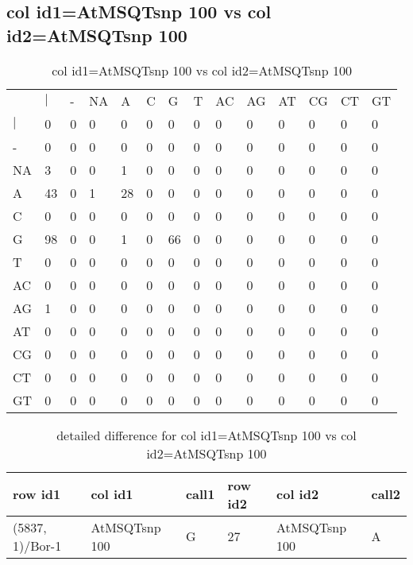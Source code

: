 \subsection{col id1=AtMSQTsnp 100 vs col id2=AtMSQTsnp 100}
\begin{center}
\begin{longtable}{|l|l|l|l|l|l|l|l|l|l|l|l|l|l|}
\caption{col id1=AtMSQTsnp 100 vs col id2=AtMSQTsnp 100} \label{table_dm488}\\
\hline
\\
\hline
&$|$&-&NA&A&C&G&T&AC&AG&AT&CG&CT&GT\\
$|$&0&0&0&0&0&0&0&0&0&0&0&0&0\\
-&0&0&0&0&0&0&0&0&0&0&0&0&0\\
NA&3&0&0&1&0&0&0&0&0&0&0&0&0\\
A&43&0&1&28&0&0&0&0&0&0&0&0&0\\
C&0&0&0&0&0&0&0&0&0&0&0&0&0\\
G&98&0&0&1&0&66&0&0&0&0&0&0&0\\
T&0&0&0&0&0&0&0&0&0&0&0&0&0\\
AC&0&0&0&0&0&0&0&0&0&0&0&0&0\\
AG&1&0&0&0&0&0&0&0&0&0&0&0&0\\
AT&0&0&0&0&0&0&0&0&0&0&0&0&0\\
CG&0&0&0&0&0&0&0&0&0&0&0&0&0\\
CT&0&0&0&0&0&0&0&0&0&0&0&0&0\\
GT&0&0&0&0&0&0&0&0&0&0&0&0&0\\
\hline
\end{longtable}
\end{center}

\begin{center}
\begin{longtable}{|l|l|l|l|l|l|}
\caption{detailed difference for col id1=AtMSQTsnp 100 vs col id2=AtMSQTsnp 100} \label{table_dm489}\\
\hline
row id1&col id1&call1&row id2&col id2&call2\\
\hline
(5837, 1)/Bor-1&AtMSQTsnp 100&G&27&AtMSQTsnp 100&A\\
\hline
\end{longtable}
\end{center}

